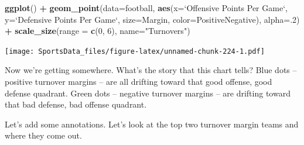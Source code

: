 \documentclass[
]{book}
\newenvironment{Shaded}{\begin{snugshade}}{\end{snugshade}}
\newcommand{\DataTypeTok}[1]{\textcolor[rgb]{0.13,0.29,0.53}{#1}}
\newcommand{\DecValTok}[1]{\textcolor[rgb]{0.00,0.00,0.81}{#1}}
\newcommand{\KeywordTok}[1]{\textcolor[rgb]{0.13,0.29,0.53}{\textbf{#1}}}
\newcommand{\NormalTok}[1]{#1}
\newcommand{\OperatorTok}[1]{\textcolor[rgb]{0.81,0.36,0.00}{\textbf{#1}}}
\newcommand{\StringTok}[1]{\textcolor[rgb]{0.31,0.60,0.02}{#1}}
\begin{document}
\begin{Shaded}
\begin{Highlighting}[]
\KeywordTok{ggplot}\NormalTok{() }\OperatorTok{+}\StringTok{ }\KeywordTok{geom_point}\NormalTok{(}\DataTypeTok{data=}\NormalTok{football, }\KeywordTok{aes}\NormalTok{(}\DataTypeTok{x=}\StringTok{`}\DataTypeTok{Offensive Points Per Game}\StringTok{`}\NormalTok{, }\DataTypeTok{y=}\StringTok{`}\DataTypeTok{Defensive Points Per Game}\StringTok{`}\NormalTok{, }\DataTypeTok{size=}\NormalTok{Margin, }\DataTypeTok{color=}\NormalTok{PositiveNegative), }\DataTypeTok{alpha=}\NormalTok{.}\DecValTok{2}\NormalTok{) }\OperatorTok{+}\StringTok{ }\KeywordTok{scale_size}\NormalTok{(}\DataTypeTok{range =} \KeywordTok{c}\NormalTok{(}\DecValTok{0}\NormalTok{, }\DecValTok{6}\NormalTok{), }\DataTypeTok{name=}\StringTok{"Turnovers"}\NormalTok{)}
\end{Highlighting}
\end{Shaded}

\texttt{[image: SportsData\_files/figure-latex/unnamed-chunk-224-1.pdf]}

Now we're getting somewhere. What's the story that this chart tells? Blue dots -- positive turnover margins -- are all drifting toward that good offense, good defense quadrant. Green dots -- negative turnover margins -- are drifting toward that bad defense, bad offense quadrant.

Let's add some annotations. Let's look at the top two turnover margin teams and where they come out.

\begin{Shaded}
\end{Shaded}
\end{document}
